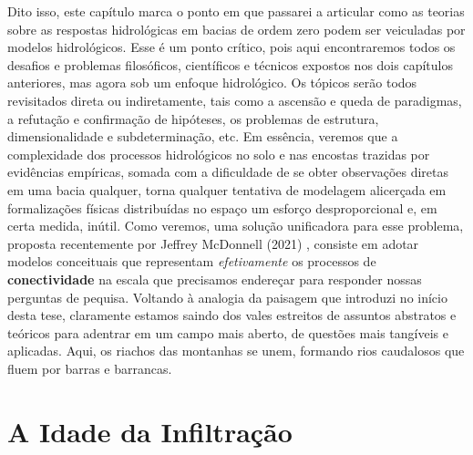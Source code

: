 \documentclass[./main.tex]{subfiles}
\begin{document}
\par Dito isso, este capítulo marca o ponto em que passarei a articular como as teorias sobre as respostas hidrológicas em bacias de ordem zero podem ser veiculadas por modelos hidrológicos. Esse é um ponto crítico, pois aqui encontraremos todos os desafios e problemas filosóficos, científicos e técnicos expostos nos dois capítulos anteriores, mas agora sob um enfoque hidrológico. Os tópicos serão todos revisitados direta ou indiretamente, tais como a ascensão e queda de paradigmas, a refutação e confirmação de hipóteses, os problemas de estrutura, dimensionalidade e subdeterminação, etc. Em essência, veremos que a complexidade dos processos hidrológicos no solo e nas encostas trazidas por evidências empíricas, somada com a dificuldade de se obter observações diretas em uma bacia qualquer, torna qualquer tentativa de modelagem alicerçada em formalizações físicas distribuídas no espaço um esforço desproporcional e, em certa medida, inútil. Como veremos, uma solução unificadora para esse problema, proposta recentemente por Jeffrey McDonnell (2021) \cite{mcdonnell2021}, consiste em adotar modelos conceituais que representam \textit{efetivamente} os processos de \textbf{conectividade} na escala que precisamos endereçar para responder nossas perguntas de pequisa. Voltando à analogia da paisagem que introduzi no início desta tese, claramente estamos saindo dos vales estreitos de assuntos abstratos e teóricos para adentrar em um campo mais aberto, de questões mais tangíveis e aplicadas. Aqui, os riachos das montanhas se unem, formando rios caudalosos que fluem por barras e barrancas.

\section{A Idade da Infiltração} \label{sec:hydro:mechs}

\end{document}
